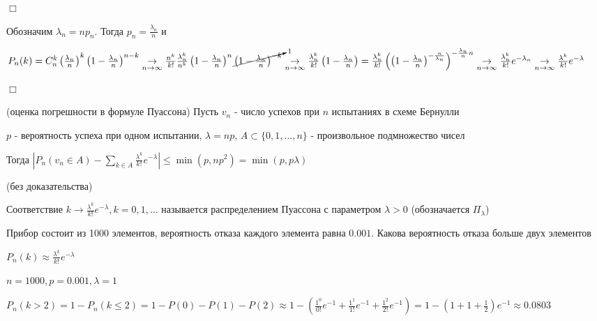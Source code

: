 \documentclass[12pt]{article}
\begin{document}
    \begin{MyProof}
        $\Box$

        Обозначим $\lambda_n = n p_n$. Тогда $p_n = \frac{\lambda_n}{n}$ и

        $P_n(k) = C^k_n \left(\frac{\lambda_n}{n}\right)^k \left(1 - \frac{\lambda_n}{n}\right)^{n - k} \underset{n \to \infty}{\rightarrow} \frac{n^k}{k!} \frac{\lambda^k_n}{n^k} \left(1 - \frac{\lambda_n}{n}\right)^n \cancelto{1}{\left(1 - \frac{\lambda_n}{n}\right)^{-k}}
        \underset{n \to \infty}{\rightarrow} \frac{\lambda_n^k}{k!} \left(1 - \frac{\lambda_n}{n}\right) = \frac{\lambda_n^k}{k!} \left(\left(1 - \frac{\lambda_n}{n}\right)^{-\frac{n}{\lambda_n}}\right)^{-\frac{\lambda_n}{n}n} \underset{n \to \infty}{\rightarrow} \frac{\lambda_n^k}{k!} e^{-\lambda_n} \underset{n \to \infty}{\rightarrow} \frac{\lambda^k}{k!} e^{-\lambda}$

        $\Box$
    \end{MyProof}

    \hypertarget{errorinpoissonformula}{}

    \begin{MyTheorem}
         (оценка погрешности в формуле Пуассона) Пусть $v_n$ - число успехов при $n$ испытаниях в схеме Бернулли

        $p$ - вероятность успеха при одном испытании, $\lambda = np$, $A \subset \{0, 1, \dots, n\}$ - произвольное подмножество чисел

        Тогда $|P_n (v_n \in A) - \sum_{k \in A} \frac{\lambda^k}{k!} e^{-\lambda}| \leq \min (p, np^2) = \min (p, p\lambda)$

        (без доказательства)
    \end{MyTheorem}

    \Def Соответствие $k \to \frac{\lambda^k}{k!} e^{-\lambda}, k = 0, 1, \dots$ называется распределением Пуассона
    с параметром $\lambda > 0$ (обозначается $\Pi_\lambda$)

    \Ex Прибор состоит из 1000 элементов, вероятность отказа каждого элемента равна $0.001$. Какова вероятность отказа больше двух элементов

    $P_n(k) \approx \frac{\lambda^k}{k!} e^{-\lambda}$

    $n = 1000, p = 0.001, \lambda = 1$

    $P_n(k > 2) = 1 - P_n (k \leq 2) = 1 - P(0) - P(1) - P(2) \approx 1 - \left(\frac{1^0}{0!} e^{-1} + \frac{1^1}{1!} e^{-1} + \frac{1^2}{2!} e^{-1}\right) =
    1 - \left(1 + 1 + \frac{1}{2}\right) e^{-1} \approx 0.0803$
\end{document}
